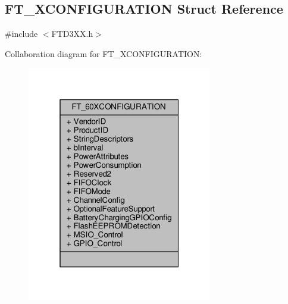 \subsection{F\+T\+\_\+X\+C\+O\+N\+F\+I\+G\+U\+R\+A\+T\+I\+ON Struct Reference}
\label{structFT__60XCONFIGURATION}


{\ttfamily \#include $<$F\+T\+D3\+X\+X.\+h$>$}



Collaboration diagram for F\+T\+\_\+X\+C\+O\+N\+F\+I\+G\+U\+R\+A\+T\+I\+ON\+:
\nopagebreak
\begin{figure}[H]
\begin{center}
\leavevmode
\includegraphics[width=229pt]{d0/da4/structFT__60XCONFIGURATION__coll__graph}
\end{center}
\end{figure}
